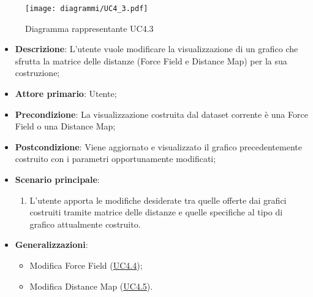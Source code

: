 \begin{figure}[h]
    \centering
    \texttt{[image: diagrammi/UC4\_3.pdf]}
    \caption{Diagramma rappresentante UC4.3}
    \label{fig:UC4.3}
\end{figure}

\begin{itemize}
    \item \textbf{Descrizione}: L’utente vuole modificare la visualizzazione di un grafico che sfrutta la matrice delle 
    distanze (Force Field e Distance Map) per la sua costruzione;
    \item \textbf{Attore primario}: Utente;
    \item \textbf{Precondizione}: La visualizzazione costruita dal dataset corrente è una Force Field o una Distance Map;
    \item \textbf{Postcondizione}: Viene aggiornato e visualizzato il grafico precedentemente costruito con i parametri opportunamente modificati;
    \item \textbf{Scenario principale}:
    \begin{enumerate}
        \item L’utente apporta le modifiche desiderate tra quelle offerte dai grafici costruiti tramite matrice delle 
        distanze e quelle specifiche al tipo di grafico attualmente costruito.
    \end{enumerate}
    \item \textbf{Generalizzazioni}:
    \begin{itemize}
        \item Modifica Force Field (\hyperref[ssub:uc4.4]{UC4.4});
        \item Modifica Distance Map (\hyperref[ssub:uc4.5]{UC4.5}).
    \end{itemize}
\end{itemize}

